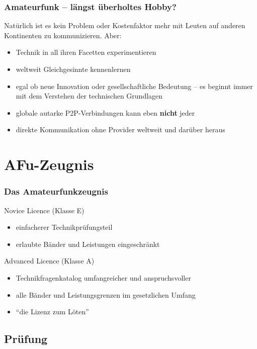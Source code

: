 \begin{frame}
  \frametitle{Amateurfunk -- längst überholtes Hobby?}

  Natürlich ist es kein Problem oder Kostenfaktor mehr mit Leuten auf
  anderen Kontinenten zu kommunizieren. Aber:

  \begin{itemize}
    \item Technik in all ihren Facetten experimentieren
    \item weltweit Gleichgesinnte kennenlernen
    \item egal ob neue Innovation oder gesellschaftliche Bedeutung -- es beginnt
      immer mit dem Verstehen der technischen Grundlagen
    \item globale autarke P2P-Verbindungen kann eben \textbf{nicht} jeder
    \item direkte Kommunikation ohne Provider weltweit und darüber heraus
  \end{itemize}

\end{frame}

\section{AFu-Zeugnis}

\begin{frame}
  \frametitle{Das Amateurfunkzeugnis}

  Novice Licence (Klasse E)

  \begin{itemize}
    \item einfacherer Technikprüfungsteil
    \item erlaubte Bänder und Leistungen eingeschränkt
  \end{itemize}

  Advanced Licence (Klasse A)

  \begin{itemize}
    \item Technikfragenkatalog umfangreicher und anspruchsvoller
    \item alle Bänder und Leistungsgrenzen im gesetzlichen Umfang
      \pause
    \item ``die Lizenz zum Löten''
  \end{itemize}

\end{frame}

\subsection{Prüfung}

